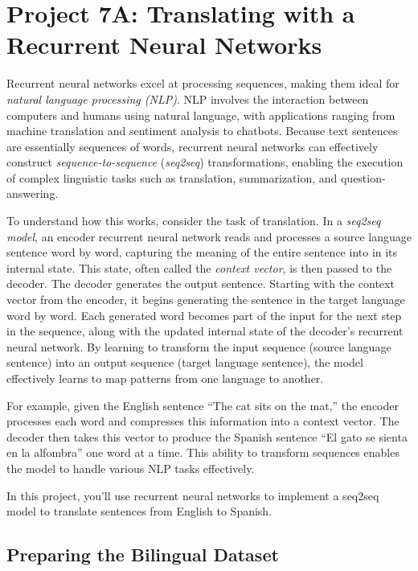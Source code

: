 \section{Project 7A: Translating with a Recurrent Neural Networks}

Recurrent neural networks excel at processing sequences, making them ideal for \emph{natural language processing (NLP)}.
NLP involves the interaction between computers and humans using natural language, with applications ranging from machine translation and sentiment analysis to chatbots. 
Because text sentences are essentially sequences of words, recurrent neural networks can effectively construct \emph{sequence-to-sequence} (\emph{seq2seq}) transformations, enabling the execution of complex linguistic tasks such as translation, summarization, and question-answering.

To understand how this works, consider the task of translation. In a \emph{seq2seq model}, an encoder recurrent neural network reads and processes a source language sentence word by word, capturing the meaning of the entire sentence into in its internal state. This state, often called the \emph{context vector}, is then passed to the decoder. The decoder generates the output sentence. Starting with the context vector from the encoder, it begins generating the sentence in the target language word by word. Each generated word becomes part of the input for the next step in the sequence, along with the updated internal state of the decoder's recurrent neural network. By learning to transform the input sequence (source language sentence) into an output sequence (target language sentence), the model effectively learns to map patterns from one language to another.

For example, given the English sentence ``The cat sits on the mat,'' the encoder processes each word and compresses this information into a context vector. The decoder then takes this vector to produce the Spanish sentence ``El gato se sienta en la alfombra'' one word at a time. This ability to transform sequences enables the model to handle various NLP tasks effectively.

In this project, you'll use recurrent neural networks to implement a seq2seq model to translate sentences from English to Spanish.

\subsection{Preparing the Bilingual Dataset}

